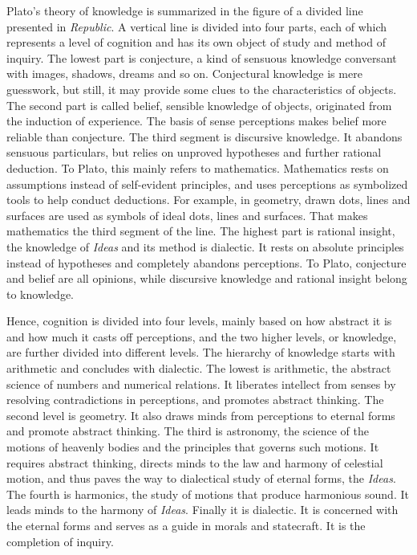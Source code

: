 \documentclass[11pt]{article}
\begin{document}
Plato’s theory of knowledge is summarized in the figure of a divided line presented in \textit{Republic}. 
A vertical line is divided into four parts, each of which represents a level of cognition and has its own object of study and method of inquiry. 
The lowest part is conjecture, a kind of sensuous knowledge conversant with images, shadows, dreams and so on. 
Conjectural knowledge is mere guesswork, but still, it may provide some clues to the characteristics of objects. 
The second part is called belief, sensible knowledge of objects, originated from the induction of experience. 
The basis of sense perceptions makes belief more reliable than conjecture. 
The third segment is discursive knowledge. 
It abandons sensuous particulars, but relies on unproved hypotheses and further rational deduction. 
To Plato, this mainly refers to mathematics. 
Mathematics rests on assumptions instead of self-evident principles, and uses perceptions as symbolized tools to help conduct deductions. 
For example, in geometry, drawn dots, lines and surfaces are used as symbols of ideal dots, lines and surfaces. 
That makes mathematics the third segment of the line. 
The highest part is rational insight, the knowledge of \textit{Ideas} and its method is dialectic. 
It rests on absolute principles instead of hypotheses and completely abandons perceptions. 
To Plato, conjecture and belief are all opinions, while discursive knowledge and rational insight belong to knowledge.

\newline

Hence, cognition is divided into four levels, mainly based on how abstract it is and how much it casts off perceptions, and the two higher levels, or knowledge, are further divided into different levels. 
The hierarchy of knowledge starts with arithmetic and concludes with dialectic. 
The lowest is arithmetic, the abstract science of numbers and numerical relations. 
It liberates intellect from senses by resolving contradictions in perceptions, and promotes abstract thinking. 
The second level is geometry. 
It also draws minds from perceptions to eternal forms and promote abstract thinking. 
The third is astronomy, the science of the motions of heavenly bodies and the principles that governs such motions. 
It requires abstract thinking, directs minds to the law and harmony of celestial motion, and thus paves the way to dialectical study of eternal forms, the \textit{Ideas}. 
The fourth is harmonics, the study of motions that produce harmonious sound. 
It leads minds to the harmony of \textit{Ideas}. 
Finally it is dialectic. 
It is concerned with the eternal forms and serves as a guide in morals and statecraft. 
It is the completion of inquiry.
\end{document}
